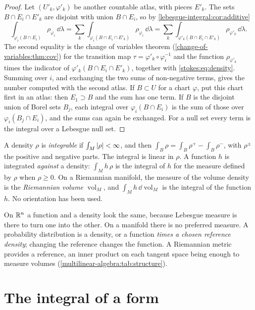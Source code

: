 \begin{notechapter}
\begin{proof}
Let $(U'_k, \varphi'_k)$ be another countable atlas, with pieces
$E'_k$. The sets $B\cap E_i\cap E'_k$ are disjoint with union
$B\cap E_i$, so by \cref{lebesgue-integral:cor:additive}
\[
  \int_{\varphi_i(B\cap E_i)}\rho_{\varphi_i}\,\dd\lambda
  = \sum_k\int_{\varphi_i(B\cap E_i\cap E'_k)}\rho_{\varphi_i}\,
    \dd\lambda
  = \sum_k\int_{\varphi'_k(B\cap E_i\cap E'_k)}\rho_{\varphi'_k}\,
    \dd\lambda .
\]
The second equality is the change of variables theorem
(\cref{change-of-variables:thm:cov}) for the transition map
$\tau = \varphi'_k\circ\varphi_i^{-1}$ and the function
$\rho_{\varphi'_k}$ times the indicator of
$\varphi'_k(B\cap E_i\cap E'_k)$, together with
\eqref{stokes:eq:density}. Summing over $i$, and exchanging the two
sums of non-negative terms, gives the number computed with the second
atlas. If $B\subset U$ for a chart $\varphi$, put this chart first in
an atlas: then $E_1\supset B$ and the sum has one term. If $B$ is the
disjoint union of Borel sets $B_j$, each integral over
$\varphi_i(B\cap E_i)$ is the sum of those over
$\varphi_i(B_j\cap E_i)$, and the sums can again be exchanged. For a
null set every term is the integral over a Lebesgue null set.
\end{proof}

A density $\rho$ is \emph{integrable} if $\int_M\left|\rho\right| < \infty$, and
then
$\int_B\rho = \int_B\rho^+ - \int_B\rho^-$,
with $\rho^\pm$ the positive and negative parts. The integral is linear
in $\rho$. A function $h$ is integrated \emph{against} a density:
$\int_Mh\,\rho$ is the integral of $h$ for the measure defined by
$\rho$ when $\rho\geq0$. On a Riemannian manifold, the measure of the
volume density is the \emph{Riemannian volume}
$\operatorname{vol}_M$, and $\int_Mh\,\dd\!\operatorname{vol}_M$ is the
integral of the function $h$. No orientation has been used.

\begin{keyidea}
On $\mathbb{R}^n$ a function and a density look the same, because Lebesgue
measure is there to turn one into the other. On a manifold there is no
preferred measure. A probability distribution is a density, or a
function \emph{times a chosen reference density}; changing the
reference changes the function. A Riemannian metric provides a
reference, an inner product on each tangent space being enough to
measure volumes (\cref{multilinear-algebra:tab:structure}).
\end{keyidea}

\section{The integral of a form}\label{stokes:sec:forms}


\end{notechapter}
